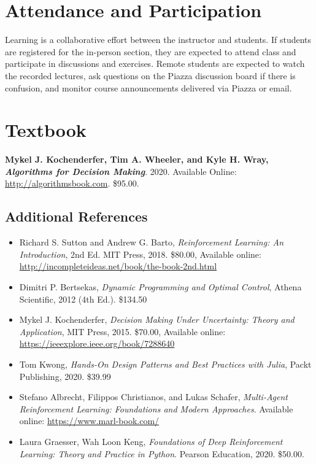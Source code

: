 \documentclass[9pt]{article}
\begin{document}
\section*{Attendance and Participation}

Learning is a collaborative effort between the instructor and students. If students are registered for the in-person section, they are expected to attend class and participate in discussions and exercises. Remote students are expected to watch the recorded lectures, ask questions on the Piazza discussion board if there is confusion, and monitor course announcements delivered via Piazza or email.

\section*{Textbook}

\textbf{Mykel J. Kochenderfer, Tim A. Wheeler, and Kyle H. Wray, \textit{Algorithms for Decision Making}}. 2020. Available Online: \url{http://algorithmsbook.com}. \$95.00.

\subsection*{Additional References}

\begin{itemize}[noitemsep]
    \item Richard S. Sutton and Andrew G. Barto, \textit{Reinforcement Learning: An Introduction}, 2nd Ed. MIT Press, 2018. \$80.00, Available online: \url{http://incompleteideas.net/book/the-book-2nd.html}
    \item Dimitri P. Bertsekas, \textit{Dynamic Programming and Optimal Control}, Athena Scientific, 2012 (4th Ed.). \$134.50
    \item Mykel J. Kochenderfer, \textit{Decision Making Under Uncertainty: Theory and Application}, MIT Press, 2015. \$70.00, Available online: \url{https://ieeexplore.ieee.org/book/7288640}
    \item Tom Kwong, \textit{Hands-On Design Patterns and Best Practices with Julia}, Packt Publishing, 2020. \$39.99
    \item Stefano Albrecht, Filippos Christianos, and Lukas Schafer, \textit{Multi-Agent Reinforcement Learning: Foundations and Modern Approaches}. Available online: \url{https://www.marl-book.com/}
    \item Laura Graesser, Wah Loon Keng, \textit{Foundations of Deep Reinforcement Learning: Theory and Practice in Python}. Pearson Education, 2020. \$50.00.
\end{itemize}
\end{document}
